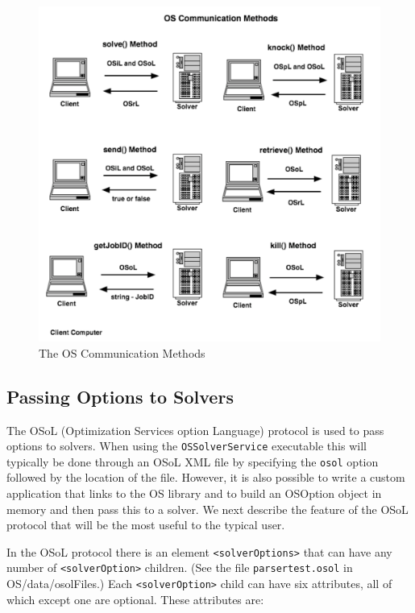 \begin{figure}[ht]
\centering
\includegraphics[scale=0.5]{./figures/osCommunicationMethods.pdf}
\caption{The OS Communication Methods}
\label{figure:osCommunicationMethods}
\end{figure}


\subsection{Passing Options to Solvers}

The OSoL (Optimization Services option Language) protocol is used to pass options to solvers.   
When using the {\tt OSSolverService} executable this will typically be done through an OSoL XML file 
by specifying the {\tt osol} option followed by the location of the file.  However, it is also possible 
to write a custom application that links to the OS library and to build an OSOption object in memory 
and then pass this to a solver. We next describe the  feature of the OSoL protocol that will be the most 
useful to the typical user.

In the OSoL protocol there is an element {\tt <solverOptions>} that can have any number of {\tt <solverOption>} 
children. (See the file {\tt parsertest.osol} in OS/data/osolFiles.)  Each {\tt <solverOption>} child can have 
six attributes, all of which except one are optional. These attributes are:

